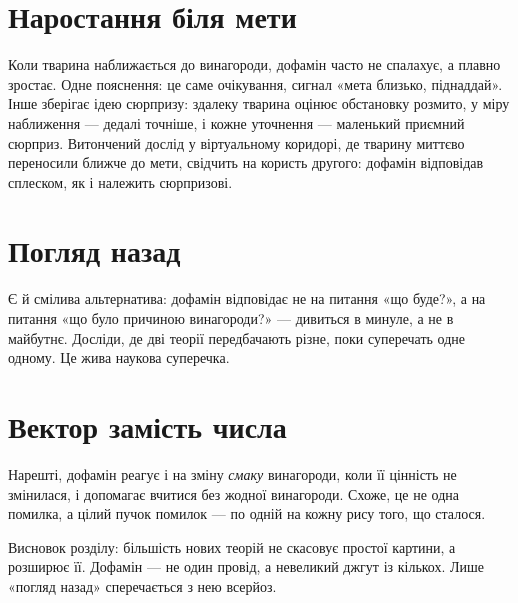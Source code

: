 \section*{Наростання біля мети}

Коли тварина наближається до винагороди, дофамін часто не спалахує, а плавно зростає. Одне пояснення: це саме очікування, сигнал «мета близько, піднаддай». Інше зберігає ідею сюрпризу: здалеку тварина оцінює обстановку розмито, у міру наближення --- дедалі точніше, і кожне уточнення --- маленький приємний сюрприз. Витончений дослід у віртуальному коридорі, де тварину миттєво переносили ближче до мети, свідчить на користь другого: дофамін відповідав сплеском, як і належить сюрпризові.

\section*{Погляд назад}

Є й смілива альтернатива: дофамін відповідає не на питання «що буде?», а на питання «що було причиною винагороди?» --- дивиться в минуле, а не в майбутнє. Досліди, де дві теорії передбачають різне, поки суперечать одне одному. Це жива наукова суперечка.

\section*{Вектор замість числа}

Нарешті, дофамін реагує і на зміну \emph{смаку} винагороди, коли її цінність не змінилася, і допомагає вчитися без жодної винагороди. Схоже, це не одна помилка, а цілий пучок помилок --- по одній на кожну рису того, що сталося.

Висновок розділу: більшість нових теорій не скасовує простої картини, а розширює її. Дофамін --- не один провід, а невеликий джгут із кількох. Лише «погляд назад» сперечається з нею всерйоз.

